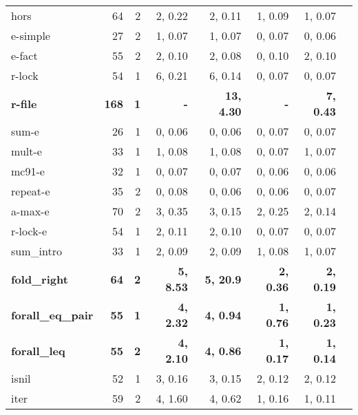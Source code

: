 \begin{table}
\begin{center}
\begin{tabular}{|l|r|r|r|r|r|r|r|}
 hors       &    64&      2& 2,  0.22 & 2,  0.11 & 1,  0.09 & 1,  0.07 \\
 e-simple   &    27&      2& 1,  0.07 & 1,  0.07 & 0,  0.07 & 0,  0.06 \\
 e-fact     &    55&      2& 2,  0.10 & 2,  0.08 & 0,  0.10 & 2,  0.10 \\
 r-lock     &    54&      1& 6,  0.21 & 6,  0.14 & 0,  0.07 & 0,  0.07 \\
\bf r-file     &\bf   168&\bf      1&\bf        - &\bf 13, 4.30 &\bf        - &\bf 7,  0.43 \\
 sum-e      &    26&      1& 0,  0.06 & 0,  0.06 & 0,  0.07 & 0,  0.07 \\
 mult-e     &    33&      1& 1,  0.08 & 1,  0.08 & 0,  0.07 & 1,  0.07 \\
 mc91-e     &    32&      1& 0,  0.07 & 0,  0.07 & 0,  0.06 & 0,  0.06 \\
 repeat-e   &    35&      2& 0,  0.08 & 0,  0.06 & 0,  0.06 & 0,  0.07 \\
 a-max-e    &    70&      2& 3,  0.35 & 3,  0.15 & 2,  0.25 & 2,  0.14 \\
 r-lock-e   &    54&      1& 2,  0.11 & 2,  0.10 & 0,  0.07 & 0,  0.07 \\
\hline
 sum\_intro        &  33 & 1 & 2, 0.09 & 2, 0.09 & 1, 0.08 & 1, 0.07 \\
\bf fold\_right       &\bf  64 &\bf 2 &\bf 5, 8.53 &\bf 5, 20.9 &\bf 2, 0.36 &\bf 2, 0.19 \\
\bf forall\_eq\_pair  &\bf  55 &\bf 1 &\bf 4, 2.32 &\bf 4, 0.94 &\bf 1, 0.76 &\bf 1, 0.23 \\
\bf forall\_leq       &\bf  55 &\bf 2 &\bf 4, 2.10 &\bf 4, 0.86 &\bf 1, 0.17 &\bf 1, 0.14 \\
 isnil             &  52 & 1 & 3, 0.16 & 3, 0.15 & 2, 0.12 & 2, 0.12 \\
 iter              &  59 & 2 & 4, 1.60 & 4, 0.62 & 1, 0.16 & 1, 0.11 \\

\end{tabular}
\end{center}
\end{table}
